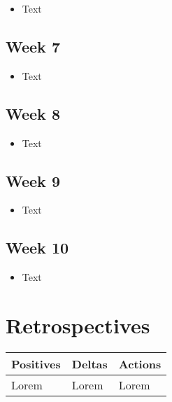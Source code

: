 \documentclass[10pt, onecolumn, draftclsnofoot, letterpaper, compsoc]{IEEEtran}
\begin{document}
\begin{itemize}

\item Text

\end{itemize}

\subsection{Week 7}

\begin{itemize}

\item Text

\end{itemize}

\subsection{Week 8}

\begin{itemize}

\item Text

\end{itemize}

\subsection{Week 9}

\begin{itemize}

\item Text

\end{itemize}

\subsection{Week 10}

\begin{itemize}

\item Text

\end{itemize}

\section{Retrospectives}

\begin{table}[h]
    \centering
    \begin{tabular}{|p{.3\linewidth}|p{.3\linewidth}|p{.3\linewidth}|}

    \cline{3-3}

    \hline \textbf{Positives} & \textbf{Deltas} & \textbf{Actions} \\ \hline

    Lorem & Lorem & Lorem \\ \hline

    \end{tabular}
\end{table}
\end{document}
